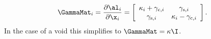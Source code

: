 \begin{equation}
  \GammaMat_i = \frac{\partial\al_i}{\partial\x_i}
  = \left[\begin{array}{cc}
    \kappa_i + \gamma_{\mathrm{c},i} & \gamma_{\mathrm{s},i} \\
    \gamma_{\mathrm{s},i} & \kappa_i - \gamma_{\mathrm{c},i}
  \end{array}\right].
\end{equation}
In the case of a void this simplifies to $\GammaMat = \kappa \I$.
 